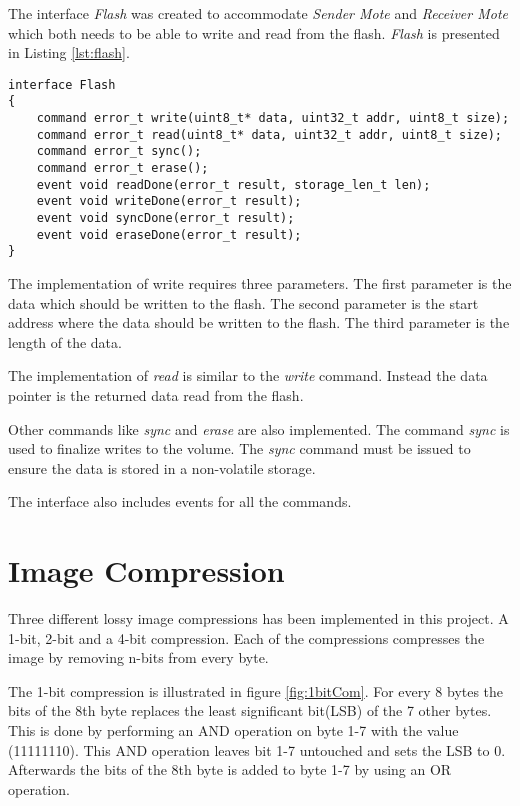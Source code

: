 The interface \emph{Flash} was created to accommodate \emph{Sender Mote} and \emph{Receiver Mote} which both needs to be able to write and read from the flash. \emph{Flash} is presented in Listing \ref{lst:flash}.

\begin{lstlisting}[caption={The interface flash}, label=lst:flash]
interface Flash
{
	command error_t write(uint8_t* data, uint32_t addr, uint8_t size);
	command error_t read(uint8_t* data, uint32_t addr, uint8_t size);
	command error_t sync();
	command error_t erase();
	event void readDone(error_t result, storage_len_t len);
	event void writeDone(error_t result);
	event void syncDone(error_t result);
	event void eraseDone(error_t result);	
}
\end{lstlisting}

The implementation of write requires three parameters. The first parameter is the data which should be written to the flash. The second parameter is the start address where the data should be written to the flash. The third parameter is the length of the data. 

The implementation of \emph{read} is similar to the \emph{write} command. Instead the data pointer is the returned data read from the flash.

Other commands like \emph{sync} and \emph{erase} are also implemented. The command \emph{sync} is used to finalize writes to the volume. The \emph{sync} command must be issued to ensure the data is stored in a non-volatile storage. 

The interface also includes events for all the commands. 

\section{Image Compression}
Three different lossy image compressions has been implemented in this project. A 1-bit, 2-bit and a 4-bit compression. Each of the compressions compresses the image by removing n-bits from every byte. 

The 1-bit compression is illustrated in figure \ref{fig:1bitCom}. For every 8 bytes the bits of the 8th byte replaces the least significant bit(LSB) of the 7 other bytes. This is done by performing an AND operation on byte 1-7 with the value (11111110). This AND operation leaves bit 1-7 untouched and sets the LSB to 0.  Afterwards the bits of the 8th byte is added to byte 1-7 by using an OR operation.

\FloatBarrier

